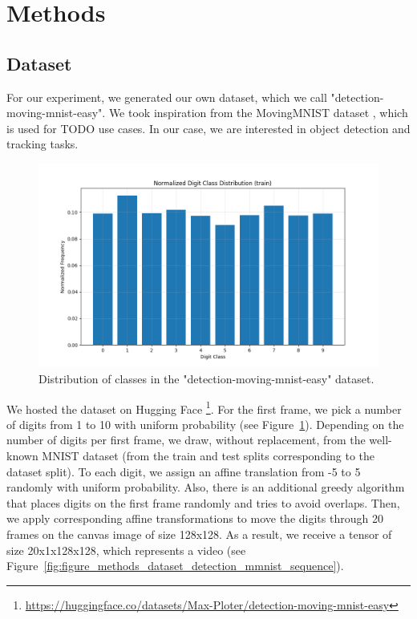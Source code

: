 \section{Methods}  \label{Methods}

\subsection{Dataset}

For our experiment, we generated our own dataset, which we call "detection-moving-mnist-easy". We took inspiration from the MovingMNIST dataset \cite{srivastava2016unsupervisedlearningvideorepresentations}, which is used for TODO use cases. In our case, we are interested in object detection and tracking tasks.

\begin{figure}
    \centering
    \includegraphics[width=\textwidth]{figures/figure_method_dataset_train_digit_classes.png}
    \caption{Distribution of classes in the "detection-moving-mnist-easy" dataset.}
    \label{fig:figure_method_dataset_train_digit_classes}
\end{figure}

We hosted the dataset on Hugging Face \footnote{\url{https://huggingface.co/datasets/Max-Ploter/detection-moving-mnist-easy}}. For the first frame, we pick a number of digits from 1 to 10 with uniform probability (see Figure~\ref{fig:figure_method_dataset_train_digit_classes}). Depending on the number of digits per first frame, we draw, without replacement, from the well-known MNIST dataset (from the train and test splits corresponding to the dataset split). To each digit, we assign an affine translation from -5 to 5 randomly with uniform probability. Also, there is an additional greedy algorithm that places digits on the first frame randomly and tries to avoid overlaps. Then, we apply corresponding affine transformations to move the digits through 20 frames on the canvas image of size 128x128. As a result, we receive a tensor of size 20x1x128x128, which represents a video (see Figure~\ref{fig:figure_methods_dataset_detection_mmnist_sequence}).


